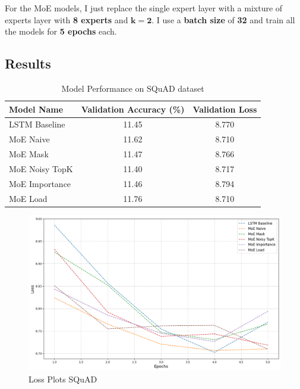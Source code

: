\documentclass[12pt]{article}
\begin{document}
For the MoE models, I just replace the single expert layer with a mixture of experts layer with \textbf{8 experts} and $\boldsymbol{k=2}$. I use a \textbf{batch size} of \textbf{32} and train all the models for \textbf{5 epochs} each.

\subsection{Results}

\begin{table}[h]
  \centering
  \begin{tabular}{lcc}
  \hline
  \textbf{Model Name} & \textbf{Validation Accuracy (\%)} & \textbf{Validation Loss} \\ \hline
  LSTM Baseline       &11.45                         &8.770                    \\
  MoE Naive           &11.62                         &8.710                    \\
  MoE Mask            &11.47                         &8.766                    \\
  MoE Noisy TopK      &11.40                         &8.717                    \\
  MoE Importance      &11.46                         &8.794                    \\
  MoE Load            &11.76                         &8.710                    \\ \hline
  \end{tabular}
  \caption{Model Performance on SQuAD dataset}
  \label{tab:performance_squad}
  \end{table}
  
\begin{figure}[h]
  \centering
  \includegraphics[width=1\linewidth]{report_images/squad/loss.png}
  \caption{\label{fig: squad_losses}Loss Plots SQuAD}
  \end{figure}
  \noindent
\end{document}
